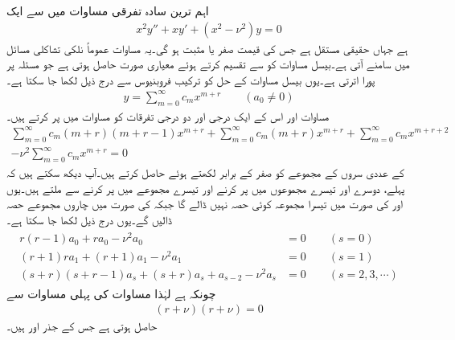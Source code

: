 اہم ترین سادہ تفرقی مساوات میں سے ایک 
\begin{align}\label{مساوات_بیسل_الف}
x^2y''+xy'+(x^2-\nu^2)y=0
\end{align}
ہے جہاں  حقیقی مستقل ہے جس کی قیمت صفر یا مثبت ہو گی۔یہ مساوات عموماً نلکی تشاکلی مسائل میں سامنے آتی ہے۔بیسل مساوات کو  سے تقسیم کرتے ہوئے معیاری صورت  حاصل ہوتی ہے جو مسئلہ  پر پورا اترتی ہے۔یوں بیسل مساوات کے حل کو ترکیب فروبنیوس سے درج ذیل لکھا جا سکتا ہے۔
\begin{align}\label{مساوات_بیسل_ب}
y=\sum_{m=0}^{\infty}c_mx^{m+r}\quad \quad (a_0 \ne 0)
\end{align}
مساوات  اور اس کے ایک درجی اور دو درجی تفرقات کو مساوات  میں پر کرتے ہیں۔
\begin{multline*}
\sum_{m=0}^{\infty}c_m(m+r)(m+r-1)x^{m+r}+\sum_{m=0}^{\infty}c_m(m+r)x^{m+r}+\sum_{m=0}^{\infty}c_mx^{m+r+2}\\
-\nu^2\sum_{m=0}^{\infty}c_mx^{m+r}=0
\end{multline*}
 کے عددی سروں کے مجموعے کو صفر کے برابر لکھتے ہوئے  حاصل کرتے ہیں۔آپ دیکھ سکتے ہیں کہ  پہلے، دوسرے اور تیسرے مجموعوں میں  پر کرنے اور تیسرے مجموعے میں  پر کرنے سے ملتے ہیں۔یوں  اور  کی صورت میں تیسرا مجموعہ کوئی حصہ نہیں ڈالے گا جبکہ  کی صورت میں چاروں مجموعے حصہ ڈالیں گے۔یوں درج ذیل لکھا جا سکتا ہے۔
\begin{gather}
\begin{aligned}\label{مساوات_بیسل_پ}
r(r-1)a_0+ra_0-\nu^2a_0&=0\quad \quad (s=0)\\
(r+1)ra_1+(r+1)a_1-\nu^2a_1&=0\quad \quad (s=1)\\
(s+r)(s+r-1)a_s+(s+r)a_s+a_{s-2}-\nu^2a_s&=0\quad \quad (s=2,3,\cdots)
\end{aligned}
\end{gather}  
چونکہ  ہے لہٰذا مساوات  کی پہلی مساوات  سے   
\begin{align}\label{مساوات_بیسل_ت}
(r+\nu)(r+\nu)=0
\end{align}
حاصل ہوتی ہے جس کے جذر  اور  ہیں۔

